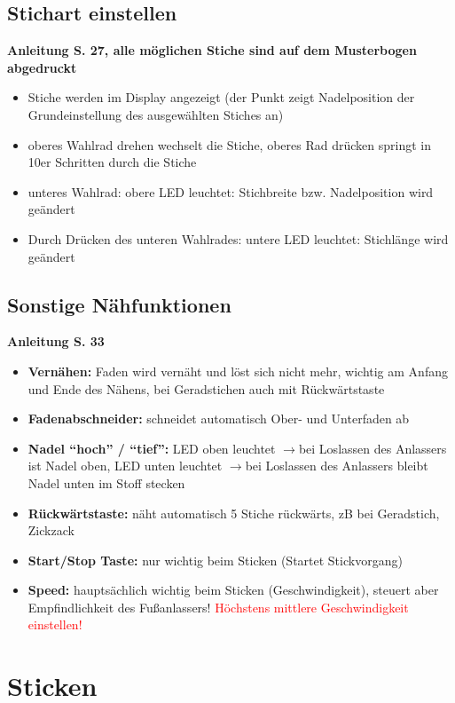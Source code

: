 \documentclass{\basedir/fablab-document}
\newcommand{\pfeil}{\ensuremath{\rightarrow}}
\begin{document}
\subsection{Stichart einstellen}
\textbf{Anleitung S. 27, alle möglichen Stiche sind auf dem Musterbogen abgedruckt}
\begin{itemize}
 \item Stiche werden im Display angezeigt (der Punkt zeigt Nadelposition der Grundeinstellung des ausgewählten Stiches an)
 \item oberes Wahlrad drehen wechselt die Stiche, oberes Rad drücken springt in 10er Schritten durch die Stiche
 \item unteres Wahlrad: obere LED leuchtet: Stichbreite bzw. Nadelposition wird geändert
 \item Durch Drücken des unteren Wahlrades: untere LED leuchtet: Stichlänge wird geändert
\end{itemize}

\subsection{Sonstige Nähfunktionen}
\textbf{Anleitung S. 33}
\begin{itemize}
 \item \textbf{Vernähen:} Faden wird vernäht und löst sich nicht mehr, wichtig am Anfang und Ende des Nähens, bei Geradstichen auch mit Rückwärtstaste
 \item \textbf{Fadenabschneider:} schneidet automatisch Ober- und Unterfaden ab
 \item \textbf{Nadel ``hoch'' / ``tief'':} LED oben leuchtet \pfeil bei Loslassen des Anlassers ist Nadel oben, LED unten leuchtet \pfeil bei Loslassen des Anlassers bleibt Nadel unten im Stoff stecken 
 \item \textbf{Rückwärtstaste:} näht automatisch 5 Stiche rückwärts, zB bei Geradstich, Zickzack
 \item \textbf{Start/Stop Taste:} nur wichtig beim Sticken (Startet Stickvorgang)
 \item \textbf{Speed:} hauptsächlich wichtig beim Sticken (Geschwindigkeit), steuert aber Empfindlichkeit des Fußanlassers! \textcolor{red}{Höchstens mittlere Geschwindigkeit einstellen!}
\end{itemize}

\pagebreak
\section{Sticken}
\end{document}
